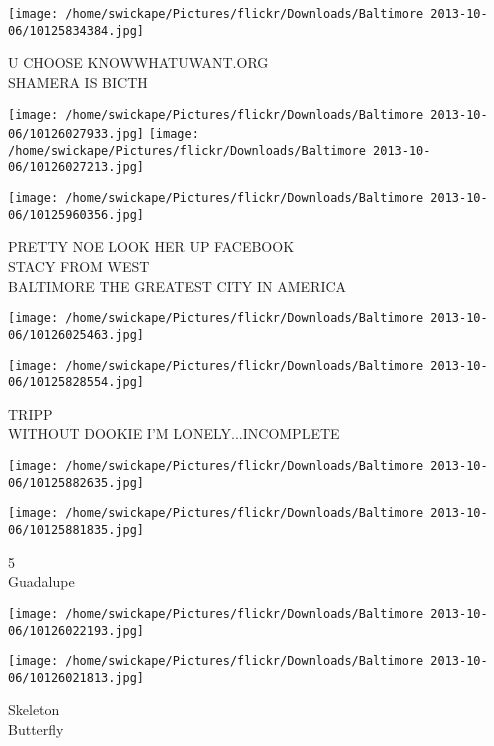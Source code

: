 \documentclass[10pt,letterpaper]{article}
\begin{document}
\vspace{0.25in}
\texttt{[image: /home/swickape/Pictures/flickr/Downloads/Baltimore 2013-10-06/10125834384.jpg]}

U CHOOSE KNOWWHATUWANT.ORG\\
SHAMERA IS BICTH\\
\pagebreak

\texttt{[image: /home/swickape/Pictures/flickr/Downloads/Baltimore 2013-10-06/10126027933.jpg]}
\texttt{[image: /home/swickape/Pictures/flickr/Downloads/Baltimore 2013-10-06/10126027213.jpg]}

\vspace{0.25in}
\texttt{[image: /home/swickape/Pictures/flickr/Downloads/Baltimore 2013-10-06/10125960356.jpg]}

PRETTY NOE LOOK HER UP FACEBOOK\\
STACY FROM WEST\\
BALTIMORE THE GREATEST CITY IN AMERICA\\
\pagebreak

\texttt{[image: /home/swickape/Pictures/flickr/Downloads/Baltimore 2013-10-06/10126025463.jpg]}

\vspace{0.25in}
\texttt{[image: /home/swickape/Pictures/flickr/Downloads/Baltimore 2013-10-06/10125828554.jpg]}

TRIPP\\
WITHOUT DOOKIE I'M LONELY...INCOMPLETE\\
\pagebreak

\texttt{[image: /home/swickape/Pictures/flickr/Downloads/Baltimore 2013-10-06/10125882635.jpg]}

\vspace{0.25in}
\texttt{[image: /home/swickape/Pictures/flickr/Downloads/Baltimore 2013-10-06/10125881835.jpg]}

5\\
Guadalupe\\
\pagebreak

\texttt{[image: /home/swickape/Pictures/flickr/Downloads/Baltimore 2013-10-06/10126022193.jpg]}

\vspace{0.25in}
\texttt{[image: /home/swickape/Pictures/flickr/Downloads/Baltimore 2013-10-06/10126021813.jpg]}

Skeleton\\
Butterfly\\
\pagebreak
\end{document}
